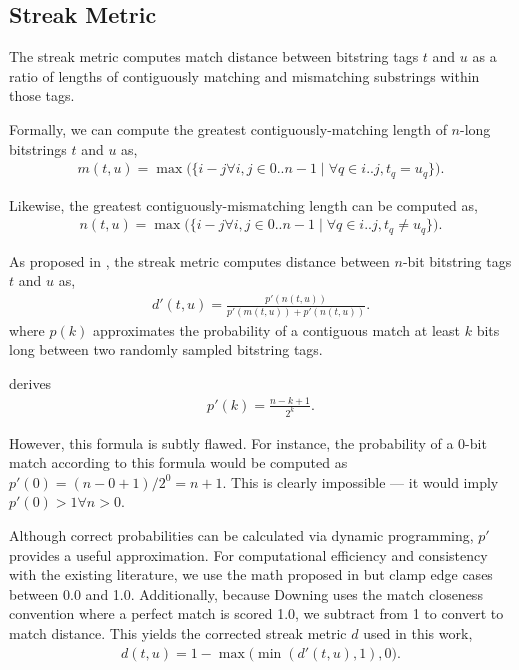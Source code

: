 \subsection{Streak Metric} \label{sec:streak}

The streak metric computes match distance between bitstring tags $t$ and $u$ as a ratio of lengths of contiguously matching and mismatching substrings within those tags.

Formally, we can compute the greatest contiguously-matching length of $n$-long bitstrings $t$ and $u$ as,
\begin{align*}
m(t, u) = \max\Big(\{i - j \forall i, j \in 0..n-1 \mid \forall q \in i..j, t_q = u_q \}\Big).
\end{align*}

Likewise, the greatest contiguously-mismatching length can be computed as,
\begin{align*}
n(t, u) = \max\Big(\{i - j \forall i, j \in 0..n-1 \mid \forall q \in i..j, t_q \neq u_q \}\Big).
\end{align*}

As proposed in \cite{downing2015intelligence}, the streak metric computes distance between $n$-bit bitstring tags $t$ and $u$ as,
\begin{align*}
d'(t, u)
= \frac{p'(n(t,u))}{p'(m(t,u)) + p'(n(t,u))}.
\end{align*}
where $p(k)$ approximates the probability of a contiguous match at least $k$ bits long between two randomly sampled bitstring tags.

\cite{downing2015intelligence} derives
\begin{align*}
p'(k)
= \frac{n - k + 1}{2^k}.
\end{align*}

However, this formula is subtly flawed.
For instance, the probability of a $0$-bit match according to this formula would be computed as $p'(0) = (n - 0 + 1)/2^0 = n + 1$.
This is clearly impossible --- it would imply $p'(0) > 1 \forall n > 0$.

Although correct probabilities can be calculated via dynamic programming, $p'$ provides a useful approximation.
For computational efficiency and consistency with the existing literature, we use the math proposed in \citep{downing2015intelligence} but clamp edge cases between 0.0 and 1.0.
Additionally, because Downing uses the match closeness convention where a perfect match is scored 1.0, we subtract from 1 to convert to match distance.
This yields the corrected streak metric $d$ used in this work,
\begin{align*}
d(t, u) = 1 - \max\Big( \min( d'(t, u), 1), 0 \Big).
\end{align*}


